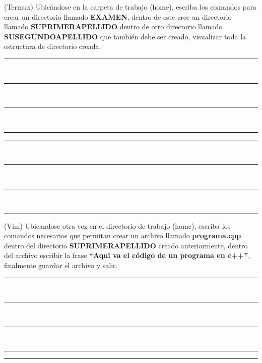 \documentclass[12pt]{exam}
\begin{document}
\begin{questions}
\question[20] (Termux) Ubicándose en la carpeta de trabajo (home), escriba los comandos  para crear un directorio
llamado \textbf{EXAMEN}, dentro de este cree un directorio llamado  \textbf{SUPRIMERAPELLIDO} dentro de otro directorio llamado 
\textbf{SUSEGUNDOAPELLIDO} que también debe ser creado, visualizar toda la estructura de directorio creada.\\


\begin{minipage}[H]{0.40\linewidth}
  \noindent \rule{7cm}{0.4pt} \\
  
  \noindent \rule{7cm}{0.4pt} \\
  
  \noindent \rule{7cm}{0.4pt} \\
  
  \noindent \rule{7cm}{0.4pt} 
  
\end{minipage} \hspace{2cm} 
\begin{minipage}[H]{0.40\linewidth}
    \noindent \rule{7cm}{0.4pt} \\
  
    \noindent \rule{7cm}{0.4pt} \\
  
    \noindent \rule{7cm}{0.4pt} \\
  
    \noindent \rule{7cm}{0.4pt} 
  
\end{minipage}

\question[20] (Vim) Ubicandose otra vez en el directorio de trabajo (home), escriba los comandos necesarios que permitan crear un archivo
llamado \textbf{programa.cpp} dentro del directorio
\textbf{SUPRIMERAPELLIDO} creado anteriormente, dentro del
archivo escribir la frase \textbf{``Aqui va el código de un programa en c++''}, finalmente guardar el archivo y salir.\\

\begin{minipage}[H]{0.40\linewidth}
  \noindent \rule{7cm}{0.4pt} \\
  
  \noindent \rule{7cm}{0.4pt} \\
  
  \noindent \rule{7cm}{0.4pt} \\
  
  \noindent \rule{7cm}{0.4pt}
\end{minipage} \hspace{2cm} 
\begin{minipage}[H]{0.40\linewidth}
    \noindent \rule{7cm}{0.4pt} \\
  


\end{minipage}
\end{questions}
\end{document}
